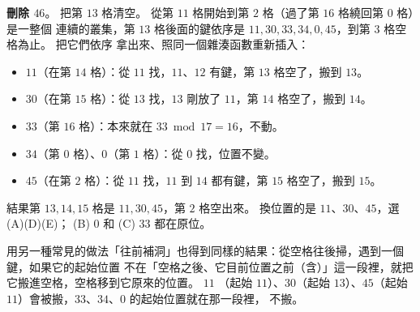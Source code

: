 \begin{pastsoln}
\textbf{刪除 $46$}。 把第 $13$ 格清空。 從第 $11$ 格開始到第 $2$ 格（過了第 $16$ 格繞回第 $0$ 格）是一整個
連續的叢集，第 $13$ 格後面的鍵依序是 $11, 30, 33, 34, 0, 45$，到第 $3$ 格空格為止。 把它們依序
拿出來、照同一個雜湊函數重新插入：
\begin{itemize}
\item $11$（在第 $14$ 格）：從 $11$ 找，$11$、$12$ 有鍵，第 $13$ 格空了，搬到 $13$。
\item $30$（在第 $15$ 格）：從 $13$ 找，$13$ 剛放了 $11$，第 $14$ 格空了，搬到 $14$。
\item $33$（第 $16$ 格）：本來就在 $33 \bmod 17 = 16$，不動。
\item $34$（第 $0$ 格）、$0$（第 $1$ 格）：從 $0$ 找，位置不變。
\item $45$（在第 $2$ 格）：從 $11$ 找，$11$ 到 $14$ 都有鍵，第 $15$ 格空了，搬到 $15$。
\end{itemize}
結果第 $13, 14, 15$ 格是 $11, 30, 45$，第 $2$ 格空出來。 換位置的是 $11$、$30$、$45$，選 (A)(D)(E)；
(B) $0$ 和 (C) $33$ 都在原位。

用另一種常見的做法「往前補洞」也得到同樣的結果：從空格往後掃，遇到一個鍵，如果它的起始位置
不在「空格之後、它目前位置之前（含）」這一段裡，就把它搬進空格，空格移到它原來的位置。 $11$
（起始 $11$）、$30$（起始 $13$）、$45$（起始 $11$）會被搬，$33$、$34$、$0$ 的起始位置就在那一段裡，
不搬。
\end{pastsoln}
